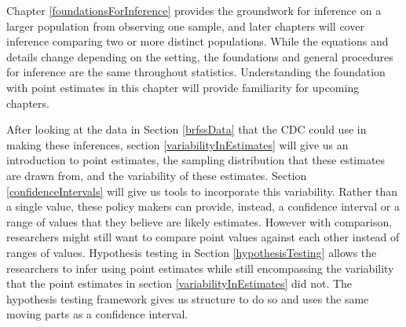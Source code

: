 Chapter \ref {foundationsForInference} provides the groundwork for inference on a larger population from observing one sample, and later chapters will cover inference comparing two or more distinct populations. While the equations and details change depending on the setting, the foundations and general procedures for inference are the same throughout statistics. Understanding the foundation with point estimates in this chapter will provide familiarity for upcoming chapters. 

After looking at the data in Section \ref{brfssData} that the CDC could use in making these inferences, section \ref{variabilityInEstimates} will give us an introduction to point estimates, the sampling distribution that these estimates are drawn from, and the variability of these estimates. Section \ref{confidenceIntervals} will give us tools to incorporate this variability. Rather than a single value, these policy makers can provide, instead, a confidence interval or a range of values that they believe are likely estimates. However with comparison, researchers might still want to compare point values against each other instead of ranges of values. Hypothesis testing in Section \ref{hypothesisTesting} allows the researchers to infer using point estimates while still encompassing the variability that the point estimates in section \ref{variabilityInEstimates} did not. The hypothesis testing framework gives us structure to do so and uses the same moving parts as a confidence interval. 

